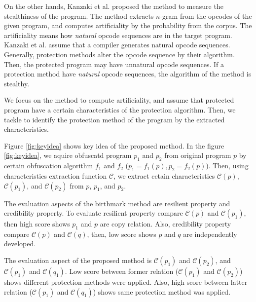 \documentclass[conference]{IEEEtran}
\newcommand{\birth}[1]{\mathcal{C}(#1)}
\begin{document}
On the other hands, Kanzaki et al. proposed the method to measure the
stealthiness of the program\cite{kanzaki14ipsj}. The method extracts
$n$-gram from the opcodes of the given program, and computes
artificiality by the probability from the corpus.  The artificiality
means how {\em natural} opcode sequences are in the target program.
Kanzaki et al. assume that a compiler generates natural opcode
sequences.  Generally, protection methods alter the opcode sequence by
their algorithm.  Then, the protected program may have unnatural
opcode sequences.  If a protection method have {\em natural} opcode
sequences, the algorithm of the method is stealthy.

We focus on the method to compute artificiality, and assume that
protected program have a certain characteristics of the protection
algorithm.  Then, we tackle to identify the protection method of the
program by the extracted characteristics.

Figure \ref{fig:keyidea} shows key idea of the proposed method.  In
the figure \ref{fig:keyidea}, we aquire obfuscatd program $p_1$ and
$p_2$ from original program $p$ by certain obfuscation algorithm $f_1$
and $f_2$ ($p_1 = f_1(p), p_2 = f_2(p)$).  Then, using characteristics
extraction function $\mathcal{C}$, we extract cetain characteristics
$\birth{p}$, $\birth{p_1}$, and $\birth{p_2}$ from $p$, $p_1$, and
$p_2$.

The evaluation aspects of the birthmark method are resilient property
and credibility property.  To evaluate resilient property compare
$\birth{p}$ and $\birth{p_1}$, then high score shows $p_1$ and $p$ are
copy relation.  Also, credibility property compare $\birth{p}$ and
$\birth{q}$, then, low score shows $p$ and $q$ are independently
developed.

The evaluation aspect of the proposed method is $\birth{p_1}$ and
$\birth{p_2}$, and $\birth{p_1}$ and $\birth{q_1}$.  Low score between
former relation ($\birth{p_1}$ and $\birth{p_2}$) shows different
protection methods were applied.  Also, high score between latter
relation ($\birth{p_1}$ and $\birth{q_1}$) shows same protection
method was applied.
\end{document}
